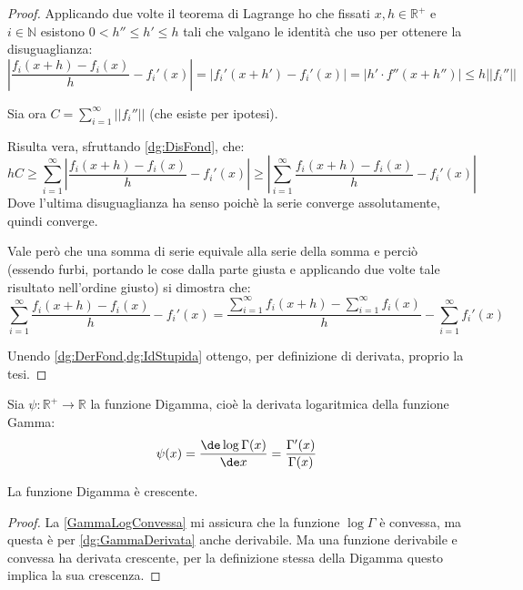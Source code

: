 \begin{proof}
	Applicando due volte il teorema di Lagrange ho che fissati $x,h\in\mathbb{R^+}$ e $i\in\mathbb{N}$
	esistono $0<h''\le h'\le h$ tali che valgano le identità che uso per ottenere la disuguaglianza:
	\begin{equation}\label{dg:DisFond}
		\left\lvert\frac{f_i(x+h)-f_i(x)}h - f_i'(x)\right\rvert=\left\lvert f_i'(x+h') - f_i'(x)\right\rvert
		=\left\lvert h'\cdot f''(x+h'') \right\rvert\le h||f_i''||
	\end{equation}
	
	Sia ora $C=\sum_{i=1}^{\infty} ||f_i''||$ (che esiste per ipotesi).
	
	Risulta vera, sfruttando \cref{dg:DisFond}, che:
	\begin{equation}\label{dg:DerFond}
		hC\ge \sum_{i=1}^{\infty}\left\lvert\frac{f_i(x+h)-f_i(x)}h - f_i'(x)\right\rvert \ge
		\left\lvert\sum_{i=1}^{\infty}\frac{f_i(x+h)-f_i(x)}h - f_i'(x)\right\rvert
	\end{equation}
	Dove l'ultima disuguaglianza ha senso poichè la serie converge assolutamente, quindi converge.
	
	Vale però che una somma di serie equivale alla serie della somma e perciò
	(essendo furbi, portando le cose dalla parte giusta e applicando due volte tale risultato nell'ordine giusto)
	si dimostra che:
	\begin{equation}\label{dg:IdStupida}
		\sum_{i=1}^{\infty}\frac{f_i(x+h)-f_i(x)}h - f_i'(x)=
		\frac{\sum_{i=1}^{\infty} f_i(x+h)- \sum_{i=1}^{\infty}f_i(x)}h -\sum_{i=1}^{\infty}f_i'(x)
	\end{equation}

	Unendo \cref{dg:DerFond,dg:IdStupida} ottengo, per definizione di derivata, proprio la tesi.
\end{proof}

\begin{definition}\label{dg:Digamma}
	Sia $\psi:\mathbb{R^+}\to\mathbb{R}$ la funzione Digamma, cioè la derivata logaritmica della funzione Gamma:
	\begin{equation*}
		\psi(x)=\frac{\de \log\Gamma(x)}{\de x}=\frac{\Gamma'(x)}{\Gamma(x)}
	\end{equation*}
\end{definition}

\begin{lemma}\label{dg:DigammaCresc}
	La funzione Digamma è crescente.
\end{lemma}
\begin{proof}
	La \cref{GammaLogConvessa} mi assicura che la funzione $\log\Gamma$ è convessa, ma questa è per \cref{dg:GammaDerivata}
	anche derivabile. Ma una funzione derivabile e convessa ha derivata crescente, per la definizione stessa della Digamma
	questo implica la sua crescenza.
\end{proof}

